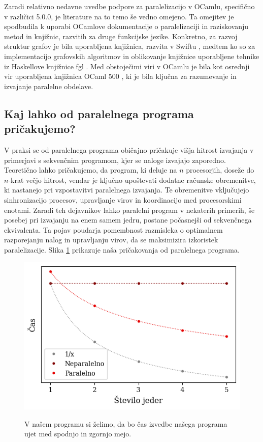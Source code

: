 \documentclass[mat1, tisk]{fmfdelo}
\begin{document}
Zaradi relativno nedavne uvedbe podpore za paralelizacijo v OCamlu, specifično v različici 5.0.0, je literature na to temo še
vedno omejeno. Ta omejitev je spodbudila k uporabi OCamlove dokumentacije o paralelizaciji \cite{ocaml_paralelisation_documentation}
in raziskovanju metod in knjižnic, razvitih za druge funkcijske jezike. Konkretno, za razvoj struktur grafov je bila uporabljena knjižnica,
razvita v Swiftu \cite{functional_swift_graph}, medtem ko so za implementacijo grafovskih algoritmov in oblikovanje knjižnice uporabljene
tehnike iz Haskellove knjižnice fgl \cite{haskell_fgl}. Med obstoječimi viri v OCamlu je bila kot osrednji vir uporabljena knjižnica
OCaml 500 \cite{ocaml_multicore_500}, ki je bila ključna za razumevanje in izvajanje paralelne obdelave.

\subsection{Kaj lahko od paralelnega programa pričakujemo?}

V praksi se od paralelnega programa običajno pričakuje višja hitrost izvajanja v primerjavi s sekvenčnim programom,
kjer se naloge izvajajo zaporedno. Teoretično lahko pričakujemo, da program, ki deluje na $n$ procesorjih,
doseže do $n$-krat večjo hitrost, vendar je ključno upoštevati dodatne računske obremenitve, ki nastanejo pri vzpostavitvi
paralelnega izvajanja. Te obremenitve vključujejo sinhronizacijo procesov, upravljanje virov in koordinacijo med procesorskimi enotami.
Zaradi teh dejavnikov lahko paralelni program v nekaterih primerih, še posebej pri izvajanju na enem samem jedru,
postane počasnejši od sekvenčnega ekvivalenta. Ta pojav poudarja pomembnost razmisleka o optimalnem razporejanju
nalog in upravljanju virov, da se maksimizira izkoristek paralelizacije. Slika \ref{fig:cilj-casovne-zahtevnosti-paralelizacije} prikazuje
naša pričakovanja od paralelnega programa.

\begin{figure}[h!]
  \centering
  \caption{V našem programu si želimo, da bo čas izvedbe našega programa ujet med spodnjo in zgornjo mejo.}
  \includegraphics[width=13cm]{slike/cilj-casovne-zahtevnosti-paralelizacije.png}
  \label{fig:cilj-casovne-zahtevnosti-paralelizacije}
\end{figure}
\end{document}
